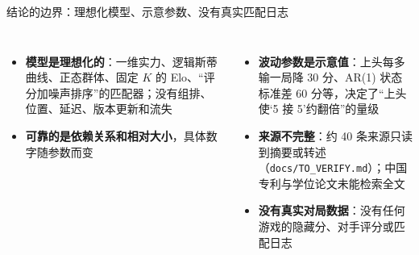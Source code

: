 \documentclass[aspectratio=169,11pt]{beamer}
\newcommand{\looselist}{\setlength{\itemsep}{4pt}\setlength{\parskip}{0pt}}
\begin{document}
\begin{frame}{结论的边界：理想化模型、示意参数、没有真实匹配日志}
\begin{columns}[T,onlytextwidth]
\small
\begin{itemize}\looselist
  \item \textbf{模型是理想化的}：一维实力、逻辑斯蒂曲线、正态群体、固定 $K$ 的 Elo、“评分加噪声排序”的匹配器；没有组排、位置、延迟、版本更新和流失
  \item \textbf{可靠的是依赖关系和相对大小}，具体数字随参数而变
\end{itemize}
\small
\begin{itemize}\looselist
  \item \textbf{波动参数是示意值}：上头每多输一局降 30 分、AR(1) 状态标准差 60 分等，决定了“上头使‘5 接 5’约翻倍”的量级
  \item \textbf{来源不完整}：约 40 条来源只读到摘要或转述（\texttt{docs/TO\_VERIFY.md}）；中国专利与学位论文未能检索全文
  \item \textbf{没有真实对局数据}：没有任何游戏的隐藏分、对手评分或匹配日志
\end{itemize}
\end{columns}
\end{frame}
\end{document}
